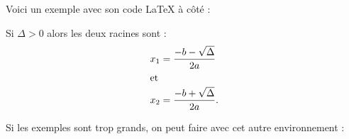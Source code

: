 \documentclass[11pt,openright,oneside,french]{book}
\begin{document}
Voici un exemple avec son code \LaTeX{} à côté : \bigskip

\begin{SideBySideExample}
    Si $\Delta > 0$ alors les deux racines sont :
    \begin{align*}
        x_1 &= \frac{-b - \sqrt\Delta}{2a}\\
        \shortintertext{et}
        x_2 &= \frac{-b + \sqrt\Delta}{2a}.
    \end{align*}
\end{SideBySideExample}
\vspace{1cm}

Si les exemples sont trop grands, on peut faire avec cet autre environnement :\bigskip

\begin{CenterExample}
    \begin{center}
    \end{center}
\end{CenterExample}
\end{document}
